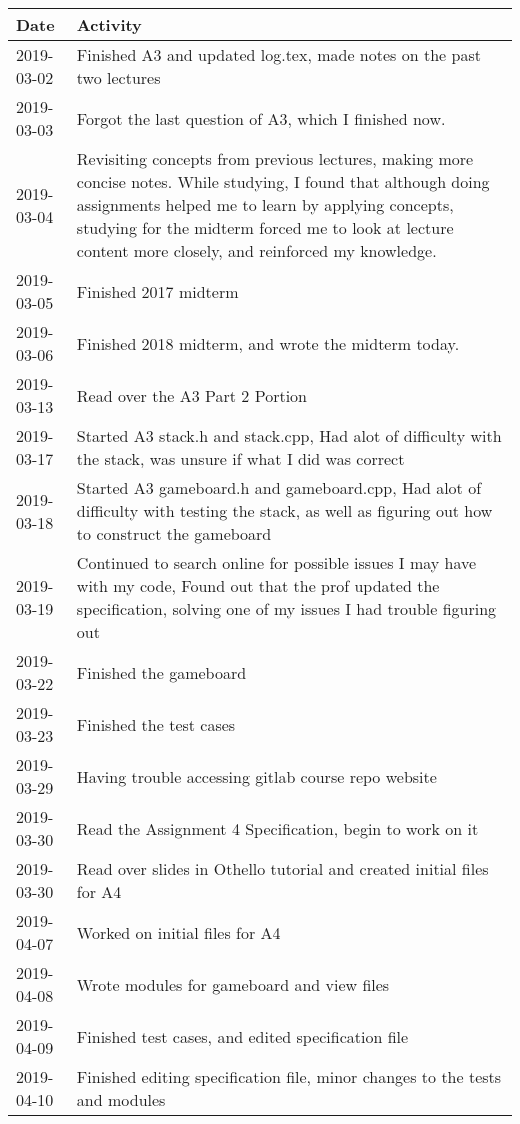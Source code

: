 \documentclass[12pt]{article}
\begin{document}
 \begin{tabular}{|p{2cm}| p{12cm}|} 
 \hline
 Date & Activity  \\ 
 
 \hline
        2019-03-02 & Finished A3 and updated log.tex, made notes on the past two lectures \\
 \hline
         2019-03-03 & Forgot the last question of A3, which I finished now. \\
 \hline
          2019-03-04 & Revisiting concepts from previous lectures, making more concise notes. While studying, I found that although doing assignments helped me to learn by applying concepts, studying for the midterm forced me to look at lecture content more closely, and reinforced my knowledge.  \\
 \hline
    2019-03-05 & Finished 2017 midterm  \\
 \hline
    2019-03-06 & Finished 2018 midterm, and wrote the midterm today.  \\
 \hline
     2019-03-13 & Read over the A3 Part 2 Portion  \\
 \hline
     2019-03-17 & Started A3 stack.h and stack.cpp, Had alot of difficulty with the stack, was unsure if what I did was correct \\
 \hline
      2019-03-18 & Started A3 gameboard.h and gameboard.cpp, Had alot of difficulty with testing the stack, as well as figuring out how to construct the gameboard \\
 \hline	
     2019-03-19 & Continued to search online for possible issues I may have with my code, Found out that the prof updated the specification, solving one of my issues I had trouble figuring out \\
 \hline	
     2019-03-22 & Finished the gameboard \\
 \hline	
     2019-03-23 & Finished the test cases \\
 \hline	
     2019-03-29 & Having trouble accessing gitlab course repo website \\
 \hline	
     2019-03-30 & Read the Assignment 4 Specification, begin to work on it \\
 \hline
     2019-03-30 & Read over slides in Othello tutorial and created initial files for A4 \\
 \hline
     2019-04-07 & Worked on initial files for A4 \\
\hline
     2019-04-08 & Wrote modules for gameboard and view files \\
\hline
     2019-04-09 & Finished test cases, and edited specification file  \\
\hline
     2019-04-10 & Finished editing specification file, minor changes to the tests and modules \\
\hline
 \end{tabular}
\end{document}
